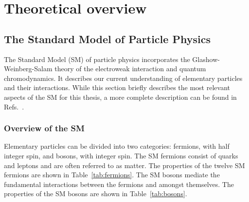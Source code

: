 \section{Theoretical overview}
\label{sec:theory}

\subsection{The Standard Model of Particle Physics}

The Standard Model (SM) of particle physics incorporates the Glashow-Weinberg-Salam theory of the electroweak interaction and quantum chromodynamics. It describes our current understanding of elementary particles and their interactions. While this section briefly describes the most relevant aspects of the SM for this thesis, a more complete description can be found in Refs.~\cite{griffiths,halzen}.

\subsubsection{Overview of the SM}

Elementary particles can be divided into two categories: fermions, with half integer spin, and bosons, with integer spin. The SM fermions consist of quarks and leptons and are often referred to as matter. The properties of the twelve SM fermions are shown in Table~\ref{tab:fermions}. The SM bosons mediate the fundamental interactions between the fermions and amongst themselves. The properties of the SM bosons are shown in Table~\ref{tab:bosons}.

